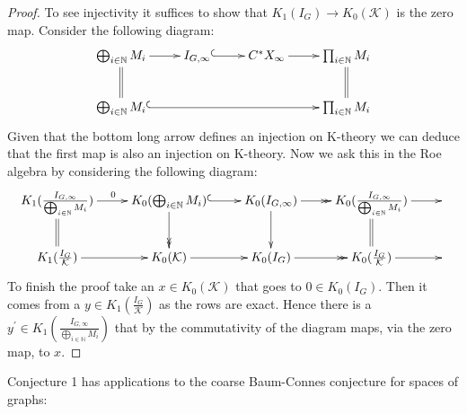 \begin{conjecture}
{\begin{proof}
To see injectivity it suffices to show that $K_{1}(I_{G})\rightarrow K_{0}(\mathcal{K})$ is the zero map. Consider the following diagram:
\begin{equation*}
\xymatrix{\bigoplus_{i \in \mathbb{N}} M_{i} \ar@{->}[r]\ar@{=}[d]  & I_{G,\infty} \ar@{^{(}->}[r]& C^{*}X_{\infty} \ar@{->}[r]& \prod_{i\in \mathbb{N}}M_{i}\ar@{=}[d]\\
\bigoplus_{i \in \mathbb{N}} M_{i}\ar@{^{(}->}[rrr] & & & \prod_{i\in \mathbb{N}}M_{i}
}
\end{equation*}
Given that the bottom long arrow defines an injection on K-theory we can deduce that the first map is also an injection on K-theory. Now we ask this in the Roe algebra by considering the following diagram:
\begin{equation*}
\xymatrix{K_{1}(\frac{I_{G,\infty}}{\bigoplus_{i\in\mathbb{N}}M_{i}})\ar@{->}[r]^{0}\ar@{=}[d]& K_{0}(\bigoplus_{i\in \mathbb{N}}M_{i}) \ar@{^{(}->}[r]\ar@{->>}[d] & K_{0}(I_{G,\infty}) \ar@{->>}[r] \ar@{->}[d] & K_{0}(\frac{I_{G,\infty}}{\bigoplus_{i\in\mathbb{N}}M_{i}})\ar@{=}[d]\ar@{->}[r]&\\
K_{1}(\frac{I_{G}}{\mathcal{K}})\ar@{->}[r]& K_{0}(\mathcal{K}) \ar@{->}[r] & K_{0}(I_{G}) \ar@{->>}[r]  & K_{0}(\frac{I_{G}}{\mathcal{K}})\ar@{->}[r]
&}
\end{equation*}
To finish the proof take an $x \in K_{0}(\mathcal{K})$ that goes to $0 \in K_{0}(I_{G})$. Then it comes from a $y \in K_{1}(\frac{I_{G}}{\mathcal{K}})$ as the rows are exact. Hence there is a $y^{'} \in K_{1}(\frac{I_{G,\infty}}{\bigoplus_{i\in\mathbb{N}}M_{i}})$ that by the commutativity of the diagram maps, via the zero map, to $x$.
\end{proof}

Conjecture 1 has applications to the coarse Baum-Connes conjecture for spaces of graphs:

}
\end{conjecture}
